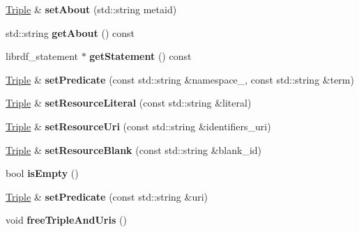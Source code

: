 \begin{DoxyCompactItemize}
\mbox{\label{classomexmeta_1_1Triple_a6329b09efb05005d248790e8a3d507f3}} 
\hyperlink{classomexmeta_1_1Triple}{Triple} \& {\bfseries set\+About} (std\+::string metaid)
\item 
\mbox{\label{classomexmeta_1_1Triple_a69df88d19e2f9077fccfa9543dadd15f}} 
std\+::string {\bfseries get\+About} () const
\item 
\mbox{\label{classomexmeta_1_1Triple_a886240fe50becaaa47ca171f2d454ba4}} 
librdf\+\_\+statement $\ast$ {\bfseries get\+Statement} () const
\item 
\mbox{\label{classomexmeta_1_1Triple_a57b4521321178af38415e76cd483207e}} 
\hyperlink{classomexmeta_1_1Triple}{Triple} \& {\bfseries set\+Predicate} (const std\+::string \&namespace\+\_\+, const std\+::string \&term)
\item 
\mbox{\label{classomexmeta_1_1Triple_a7358812badc8d0d5589a0165af4ad375}} 
\hyperlink{classomexmeta_1_1Triple}{Triple} \& {\bfseries set\+Resource\+Literal} (const std\+::string \&literal)
\item 
\mbox{\label{classomexmeta_1_1Triple_ae6836c6e9d06a310a120345aa95a4daa}} 
\hyperlink{classomexmeta_1_1Triple}{Triple} \& {\bfseries set\+Resource\+Uri} (const std\+::string \&identifiers\+\_\+uri)
\item 
\mbox{\label{classomexmeta_1_1Triple_a90ffe9b74d354cc3fe3132a07546f6d1}} 
\hyperlink{classomexmeta_1_1Triple}{Triple} \& {\bfseries set\+Resource\+Blank} (const std\+::string \&blank\+\_\+id)
\item 
\mbox{\label{classomexmeta_1_1Triple_a34832780748d58b0fddea6f6f079217a}} 
bool {\bfseries is\+Empty} ()
\item 
\mbox{\label{classomexmeta_1_1Triple_a1a99a566a9d1883c6329a023f4dbc056}} 
\hyperlink{classomexmeta_1_1Triple}{Triple} \& {\bfseries set\+Predicate} (const std\+::string \&uri)
\item 
\mbox{\label{classomexmeta_1_1Triple_ab89993902b551b98d9e17e4fe5ebed6b}} 
void {\bfseries free\+Triple\+And\+Uris} ()
\end{DoxyCompactItemize}
